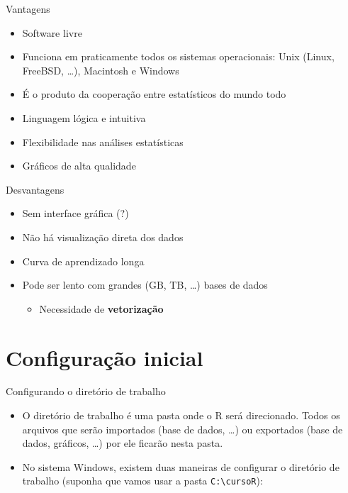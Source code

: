 \documentclass[10pt,handout]{beamer}\usepackage{graphicx, color}
\begin{document}
\begin{frame}{Vantagens}
\begin{itemize}
\item Software livre
\item Funciona em praticamente todos os sistemas operacionais: Unix
  (Linux, FreeBSD, \ldots), Macintosh e Windows
\item É o produto da cooperação entre estatísticos do mundo todo
\item Linguagem lógica e intuitiva
\item Flexibilidade nas análises estatísticas
\item Gráficos de alta qualidade
\end{itemize}
\end{frame}

\begin{frame}{Desvantagens}
\begin{itemize}
\item Sem interface gráfica (?)
\item Não há visualização direta dos dados
\item Curva de aprendizado longa
\item Pode ser lento com grandes (GB, TB, \ldots) bases de dados
  \begin{itemize}
  \item Necessidade de \textbf{vetorização}
  \end{itemize}
\end{itemize}
\end{frame}

\section{Configuração inicial}

\begin{frame}[fragile=singleslide]{Configurando o diretório de trabalho}
\begin{itemize}
\item O diretório de trabalho é uma pasta onde o R será
  direcionado. Todos os arquivos que serão importados (base de dados,
  \ldots) ou exportados (base de dados, gráficos, \ldots) por ele
  ficarão nesta pasta.
\item No sistema Windows, existem duas maneiras de configurar o
  diretório de trabalho (suponha que vamos usar a pasta
  \verb|C:\cursoR|):
\end{itemize}
\end{frame}
\end{document}
